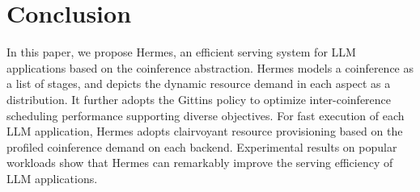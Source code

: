\section{Conclusion}
\label{sec:conlucsion}

In this paper, we propose Hermes, an efficient serving system for LLM applications based on the coinference abstraction.
Hermes models a coinference as a list of stages, and depicts the dynamic resource demand in each aspect as a distribution.  
It further adopts the Gittins policy to optimize inter-coinference scheduling performance supporting diverse objectives.
For fast execution of each LLM application, Hermes adopts clairvoyant resource provisioning based on the profiled coinference demand on each backend.
Experimental results on popular workloads show that Hermes can remarkably improve the serving efficiency of LLM applications.